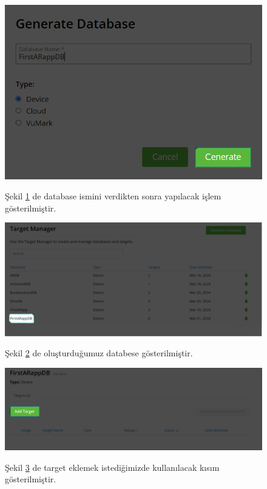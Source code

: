 \documentclass[12pt, a4paper]{article}
\begin{document}
	\begin{figure}[!ht]
		\caption{}
		\centering
		\includegraphics[angle=0, width=\textwidth]{Vuforia8.PNG}
		
		\label{gantt6}
		Şekil \ref{gantt6} de  database ismini verdikten sonra yapılacak işlem gösterilmiştir.\cite{Vuforia}	
	\end{figure}
	\newpage
	\begin{figure}[!ht]
		\caption{}
		\centering
		\includegraphics[angle=0, width=\textwidth]{Vuforia9.PNG}
		
		\label{gantt7}
		Şekil \ref{gantt7} de oluşturduğumuz databese gösterilmiştir.\cite{Vuforia}	
	\end{figure}
	\newpage
	\begin{figure}[!ht]
		\caption{}
		\centering
		\includegraphics[angle=0, width=\textwidth]{Vuforia10.PNG}
		
		\label{gantt8}
		Şekil \ref{gantt8} de target eklemek istediğimizde kullanılacak kısım gösterilmiştir.\cite{Vuforia}	
	\end{figure}
\end{document}
